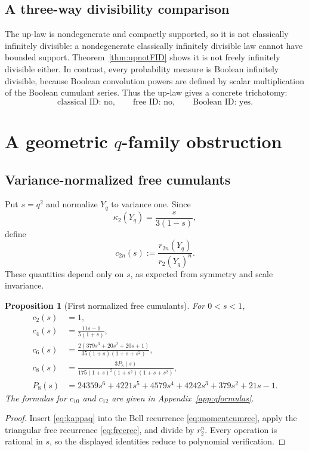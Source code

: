 \documentclass[11pt,oneside]{article}
\newtheorem{proposition}[theorem]{Proposition}
\theoremstyle{definition}
\theoremstyle{remark}
\begin{document}
\subsection{A three-way divisibility comparison}
The up-law is nondegenerate and compactly supported, so it is not classically infinitely divisible: a nondegenerate classically infinitely divisible law cannot have bounded support. Theorem~\ref{thm:upnotFID} shows it is not freely infinitely divisible either. In contrast, every probability measure is Boolean infinitely divisible, because Boolean convolution powers are defined by scalar multiplication of the Boolean cumulant series. Thus the up-law gives a concrete trichotomy:
\[
\text{classical ID: no},\qquad \text{free ID: no},\qquad \text{Boolean ID: yes}.
\]

\section{A geometric \texorpdfstring{\(q\)}{q}-family obstruction}
\subsection{Variance-normalized free cumulants}
Put \(s=q^2\) and normalize \(Y_q\) to variance one. Since
\[
\kappa_2(Y_q)=\frac{s}{3(1-s)},
\]
define
\[
c_{2n}(s):=\frac{r_{2n}(Y_q)}{r_2(Y_q)^n}.
\]
These quantities depend only on \(s\), as expected from symmetry and scale invariance.

\begin{proposition}[First normalized free cumulants]\label{prop:qfree}
For \(0<s<1\),
\begin{align}
c_2(s)&=1,\label{eq:c2s}\\
c_4(s)&=\frac{11s-1}{5(1+s)},\label{eq:c4s}\\
c_6(s)&=\frac{2(379s^3+20s^2+20s+1)}{35(1+s)(1+s+s^2)},\label{eq:c6s}\\
c_8(s)&=\frac{3P_8(s)}{175(1+s)^2(1+s^2)(1+s+s^2)},\label{eq:c8s}\\
P_8(s)&=24359s^6+4221s^5+4579s^4+4242s^3+379s^2+21s-1.\nonumber
\end{align}
The formulas for \(c_{10}\) and \(c_{12}\) are given in Appendix~\ref{app:qformulas}.
\end{proposition}
\begin{proof}
Insert \eqref{eq:kappaq} into the Bell recurrence \eqref{eq:momentcumrec}, apply the triangular free recurrence \eqref{eq:freerec}, and divide by \(r_2^n\). Every operation is rational in \(s\), so the displayed identities reduce to polynomial verification.
\end{proof}
\end{document}
